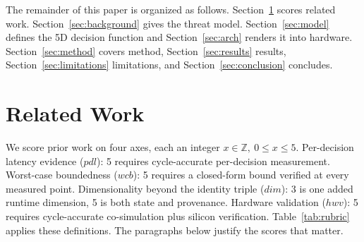 \documentclass[conference]{IEEEtran}
\begin{document}

The remainder of this paper is organized as follows. Section~\ref{sec:related} scores related work. Section~\ref{sec:background} gives the threat model. Section~\ref{sec:model} defines the 5D decision function and Section~\ref{sec:arch} renders it into hardware. Section~\ref{sec:method} covers method, Section~\ref{sec:results} results, Section~\ref{sec:limitations} limitations, and Section~\ref{sec:conclusion} concludes.

\section{Related Work}
\label{sec:related}

We score prior work on four axes, each an integer $x \in \mathbb{Z},\ 0 \le x \le 5$. Per-decision latency evidence ($\mathit{pdl}$): 5 requires cycle-accurate per-decision measurement. Worst-case boundedness ($\mathit{wcb}$): 5 requires a closed-form bound verified at every measured point. Dimensionality beyond the identity triple ($\mathit{dim}$): 3 is one added runtime dimension, 5 is both state and provenance. Hardware validation ($\mathit{hwv}$): 5 requires cycle-accurate co-simulation plus silicon verification. Table~\ref{tab:rubric} applies these definitions. The paragraphs below justify the scores that matter.
\end{document}
